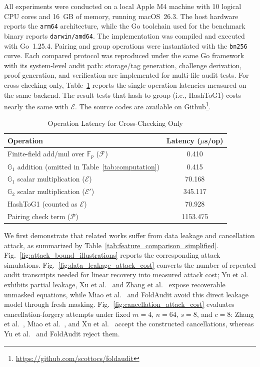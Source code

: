 \documentclass[lettersize,journal]{IEEEtran}
\newcommand{\GG}{\mathbb{G}}
\newcommand{\FF}{\mathbb{F}}
\newcommand{\CompExp}{\mathcal{E}}
\newcommand{\CompPair}{\mathcal{P}}
\newcommand{\CompField}{\mathcal{F}}
\newcommand{\ComField}{\CompField}
\begin{document}
All experiments were conducted on a local Apple M4 machine with 10 logical CPU cores and 16~GB of memory, running macOS~26.3. The host hardware reports the \texttt{arm64} architecture, while the Go toolchain used for the benchmark binary reports \texttt{darwin/amd64}. The implementation was compiled and executed with Go~1.25.4. Pairing and group operations were instantiated with the \texttt{bn256} curve. Each compared protocol was reproduced under the same Go framework with its system-level audit path: storage/tag generation, challenge derivation, proof generation, and verification are implemented for multi-file audit tests.
For cross-checking only, Table~\ref{tab:primitive_latency} reports the
single-operation latencies measured on the same backend.
The result tests that hash-to-group (i.e., \textsf{HashToG1}) costs nearly the same with $\CompExp$. The source codes are available on Github\footnote{\url{https://github.com/scottocs/foldaudit}}.

\begin{table}[h]
\centering
\caption{Operation Latency for Cross-Checking Only}
\label{tab:primitive_latency}
\renewcommand{\arraystretch}{1.2}
\begin{tabular}{l|c}
\hline
\textbf{Operation} & \textbf{Latency ($\mu$s/op)} \\
\hline
Finite-field add/mul over \(\FF_p\) (\(\ComField\)) & 0.410 \\
\(\GG_1\) addition (omitted in Table~\ref{tab:computation}) & 0.415 \\
\(\GG_1\) scalar multiplication (\(\CompExp\)) & 70.168 \\
\(\GG_2\) scalar multiplication (\(\CompExp'\)) & 345.117 \\
\textsf{HashToG1} (counted as \(\CompExp\)) & 70.928 \\
Pairing check term (\(\CompPair\)) & 1153.475 \\
\hline
\end{tabular}
\end{table}



We first demonstrate that related works suffer from data leakage and cancellation attack, as summarized by Table~\ref{tab:feature_comparison_simplified}. Fig.~\ref{fig:attack_bound_illustrations} reports the corresponding attack simulations. Fig.~\ref{fig:data_leakage_attack_cost} converts the number of repeated audit transcripts needed for linear recovery into measured attack cost; Yu et al.~\cite{YuTC25} exhibits partial leakage, Xu et al.~\cite{XuTIFS26} and Zhang et al.~\cite{ZhangTPDS23} expose recoverable unmasked equations, while Miao et al.~\cite{MiaoSCIS2026} and FoldAudit avoid this direct leakage model through fresh masking. Fig.~\ref{fig:cancellation_attack_cost} evaluates cancellation-forgery attempts under fixed \(m=4\), \(n=64\), \(s=8\), and \(c=8\): Zhang et al.~\cite{ZhangTPDS23}, Miao et al.~\cite{MiaoSCIS2026}, and Xu et al.~\cite{XuTIFS26} accept the constructed cancellations, whereas Yu et al.~\cite{YuTC25} and FoldAudit reject them.
\end{document}
